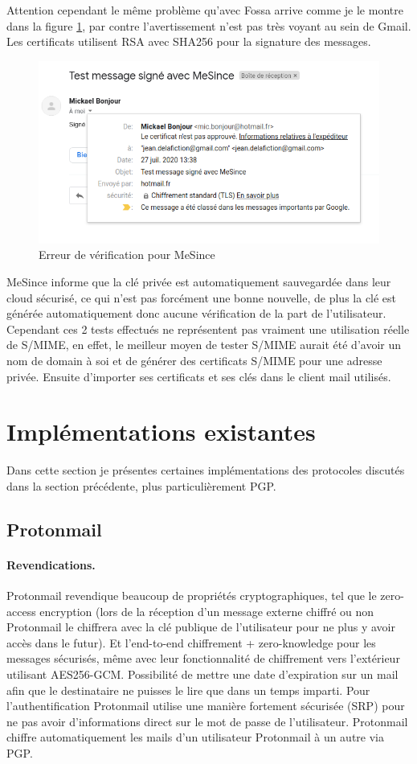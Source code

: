 Attention cependant le même problème qu'avec Fossa arrive comme je le montre dans la figure \ref{fig:SMIME_MeSinceProblem}, par contre l'avertissement n'est pas très voyant au sein de Gmail. Les certificats utilisent RSA avec SHA256 pour la signature des messages.
\begin{figure}[h!]
	\includegraphics[width=15cm]{images/mesince_problem.png}
	\centering
	\caption{Erreur de vérification pour MeSince}
	\label{fig:SMIME_MeSinceProblem}
\end{figure}
MeSince informe que la clé privée est automatiquement sauvegardée dans leur cloud sécurisé, ce qui n'est pas forcément une bonne nouvelle, de plus la clé est générée automatiquement donc aucune vérification de la part de l'utilisateur.
Cependant ces 2 tests effectués ne représentent pas vraiment une utilisation réelle de S/MIME, en effet, le meilleur moyen de tester S/MIME aurait été d'avoir un nom de domain à soi et de générer des certificats S/MIME pour une adresse privée. Ensuite d'importer ses certificats et ses clés dans le client mail utilisés.
\section{Implémentations existantes}
Dans cette section je présentes certaines implémentations des protocoles discutés dans la section précédente, plus particulièrement PGP.
\subsection{Protonmail}
\paragraph*{Revendications.}
Protonmail revendique beaucoup de propriétés cryptographiques, tel que le zero-access encryption (lors de la réception d'un message externe chiffré ou non Protonmail le chiffrera avec la clé publique de l'utilisateur pour ne plus y avoir accès dans le futur). Et l’end-to-end chiffrement + zero-knowledge pour les messages sécurisés, même avec leur fonctionnalité de chiffrement vers l'extérieur utilisant AES256-GCM. Possibilité de mettre une date d'expiration sur un mail afin que le destinataire ne puisses le lire que dans un temps imparti.
Pour l'authentification Protonmail utilise une manière fortement sécurisée (SRP) pour ne pas avoir d'informations direct sur le mot de passe de l'utilisateur.
Protonmail chiffre automatiquement les mails d'un utilisateur Protonmail à un autre via PGP.
